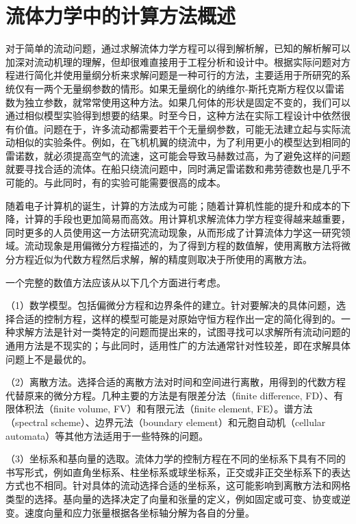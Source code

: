 \section{流体力学中的计算方法概述}

对于简单的流动问题，通过求解流体力学方程可以得到解析解，已知的解析解可以加深对流动机理的理解，但却很难直接用于工程分析和设计中。根据实际问题对方程进行简化并使用量纲分析来求解问题是一种可行的方法，主要适用于所研究的系统仅有一两个无量纲参数的情形。如果无量纲化的纳维尔-斯托克斯方程仅以雷诺数为独立参数，就常常使用这种方法。如果几何体的形状是固定不变的，我们可以通过相似模型实验得到想要的结果。时至今日，这种方法在实际工程设计中依然很有价值。问题在于，许多流动都需要若干个无量纲参数，可能无法建立起与实际流动相似的实验条件。例如，在飞机机翼的绕流中，为了利用更小的模型达到相同的雷诺数，就必须提高空气的流速，这可能会导致马赫数过高，为了避免这样的问题就要寻找合适的流体。在船只绕流问题中，同时满足雷诺数和弗劳德数也是几乎不可能的。与此同时，有的实验可能需要很高的成本。

随着电子计算机的诞生，计算的方法成为可能；随着计算机性能的提升和成本的下降，计算的手段也更加简易而高效。用计算机求解流体力学方程变得越来越重要，同时更多的人员使用这一方法研究流动现象，从而形成了计算流体力学这一研究领域。流动现象是用偏微分方程描述的，为了得到方程的数值解，使用离散方法将微分方程近似为代数方程然后求解，解的精度则取决于所使用的离散方法。

一个完整的数值方法应该从以下几个方面进行考虑。

（1）数学模型。包括偏微分方程和边界条件的建立。针对要解决的具体问题，选择合适的控制方程，这样的模型可能是对原始守恒方程作出一定的简化得到的。一种求解方法是针对一类特定的问题而提出来的，试图寻找可以求解所有流动问题的通用方法是不现实的；与此同时，适用性广的方法通常针对性较差，即在求解具体问题上不是最优的。

（2）离散方法。选择合适的离散方法对时间和空间进行离散，用得到的代数方程代替原来的微分方程。几种主要的方法是有限差分法（finite difference, FD）、有限体积法（finite volume, FV）和有限元法（finite element, FE）。谱方法（spectral scheme）、边界元法（boundary element）和元胞自动机（cellular automata）等其他方法适用于一些特殊的问题。

（3）坐标系和基向量的选取。流体力学的控制方程在不同的坐标系下具有不同的书写形式，例如直角坐标系、柱坐标系或球坐标系，正交或非正交坐标系下的表达方式也不相同。针对具体的流动选择合适的坐标系，这可能影响到离散方法和网格类型的选择。基向量的选择决定了向量和张量的定义，例如固定或可变、协变或逆变。速度向量和应力张量根据各坐标轴分解为各自的分量。

